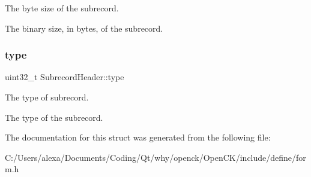 The byte size of the subrecord. 

The binary size, in bytes, of the subrecord. \mbox{\label{struct_subrecord_header_a549017a7821553ae4e4ceb72322b0464}} 
\subsubsection{\texorpdfstring{type}{type}}
{\footnotesize\ttfamily uint32\+\_\+t Subrecord\+Header\+::type}



The type of subrecord. 

The type of the subrecord. 

The documentation for this struct was generated from the following file\+:\begin{DoxyCompactItemize}
\item 
C\+:/\+Users/alexa/\+Documents/\+Coding/\+Qt/why/openck/\+Open\+C\+K/include/define/form.\+h\end{DoxyCompactItemize}
